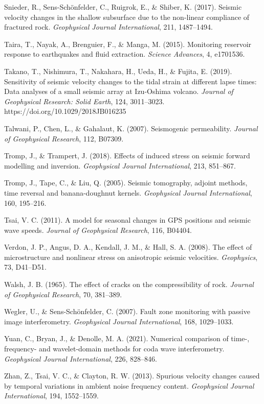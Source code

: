 \documentclass[draft]{agujournal2019}
\begin{document}
Snieder, R., Sens-Schönfelder, C., Ruigrok, E., \& Shiber, K. (2017).
Seismic velocity changes in the shallow subsurface due to the non-linear
compliance of fractured rock. \emph{Geophysical Journal International},
211, 1487--1494.

Taira, T., Nayak, A., Brenguier, F., \& Manga, M. (2015). Monitoring
reservoir response to earthquakes and fluid extraction. \emph{Science
Advances}, 4, e1701536.

Takano, T., Nishimura, T., Nakahara, H., Ueda, H., \& Fujita, E. (2019).
Sensitivity of seismic velocity changes to the tidal strain at different
lapse times: Data analyses of a small seismic array at Izu-Oshima
volcano. \emph{Journal of Geophysical Research: Solid Earth}, 124,
3011--3023. https://doi.org/10.1029/2018JB016235

Talwani, P., Chen, L., \& Gahalaut, K. (2007). Seismogenic permeability.
\emph{Journal of Geophysical Research}, 112, B07309.

Tromp, J., \& Trampert, J. (2018). Effects of induced stress on seismic
forward modelling and inversion. \emph{Geophysical Journal
International}, 213, 851--867.

Tromp, J., Tape, C., \& Liu, Q. (2005). Seismic tomography, adjoint
methods, time reversal and banana-doughnut kernels. \emph{Geophysical
Journal International}, 160, 195--216.

Tsai, V. C. (2011). A model for seasonal changes in GPS positions and
seismic wave speeds. \emph{Journal of Geophysical Research}, 116,
B04404.

Verdon, J. P., Angus, D. A., Kendall, J. M., \& Hall, S. A. (2008). The
effect of microstructure and nonlinear stress on anisotropic seismic
velocities. \emph{Geophysics}, 73, D41--D51.

Walsh, J. B. (1965). The effect of cracks on the compressibility of
rock. \emph{Journal of Geophysical Research}, 70, 381--389.

Wegler, U., \& Sens-Schönfelder, C. (2007). Fault zone monitoring with
passive image interferometry. \emph{Geophysical Journal International},
168, 1029--1033.

Yuan, C., Bryan, J., \& Denolle, M. A. (2021). Numerical comparison of
time-, frequency- and wavelet-domain methods for coda wave
interferometry. \emph{Geophysical Journal International}, 226, 828--846.

Zhan, Z., Tsai, V. C., \& Clayton, R. W. (2013). Spurious velocity
changes caused by temporal variations in ambient noise frequency
content. \emph{Geophysical Journal International}, 194, 1552--1559.
\end{document}
